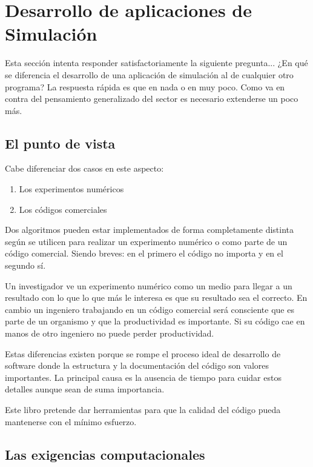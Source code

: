 \section{Desarrollo de aplicaciones de Simulación}

Esta sección intenta responder satisfactoriamente la siguiente
pregunta... ¿En qué se diferencia el desarrollo de una aplicación de
simulación al de cualquier otro programa?  La respuesta rápida es que
en nada o en muy poco.  Como va en contra del pensamiento generalizado
del sector es necesario extenderse un poco más.

\subsection{El punto de vista}


Cabe diferenciar dos casos en este aspecto:

\begin{enumerate}
\item Los experimentos numéricos

\item Los códigos comerciales
\end{enumerate}

Dos algoritmos pueden estar implementados de forma completamente
distinta según se utilicen para realizar un experimento numérico o
como parte de un código comercial.  Siendo breves: en el primero el
código no importa y en el segundo sí.

Un investigador ve un experimento numérico como un medio para llegar a
un resultado con lo que lo que más le interesa es que su resultado sea
el correcto.  En cambio un ingeniero trabajando en un código comercial
será consciente que es parte de un organismo y que la productividad es
importante.  Si su código cae en manos de otro ingeniero no puede
perder productividad.

Estas diferencias existen porque se rompe el proceso ideal de
desarrollo de software donde la estructura y la documentación del
código son valores importantes.  La principal causa es la ausencia de
tiempo para cuidar estos detalles aunque sean de suma importancia.

Este libro pretende dar herramientas para que la calidad del código
pueda mantenerse con el mínimo esfuerzo.

\subsection{Las exigencias computacionales}

